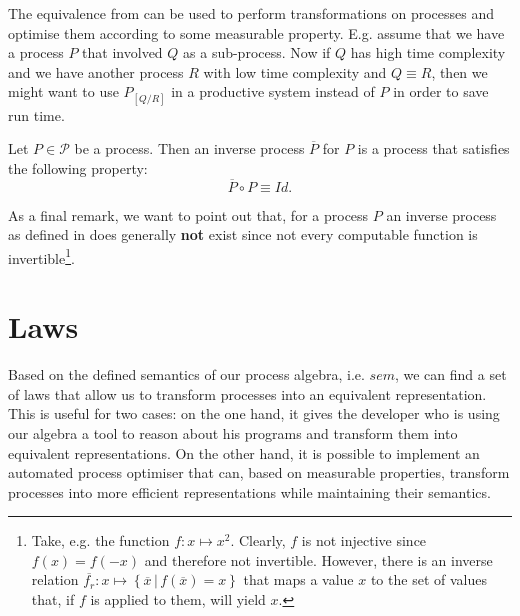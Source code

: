 The equivalence from  can be used to perform transformations on processes and optimise them according to some measurable property. E.g. assume that we have a process $P$ that involved $Q$ as a sub-process. Now if $Q$ has high time complexity and we have another process $R$ with low time complexity and $Q \equiv R$, then we might want to use $P_{\left[ Q / R \right]}$ in a productive system instead of $P$ in order to save run time.

\begin{definition}
\label{def:inverse_process}
Let $P \in \mathcal{P}$ be a process. Then an inverse process $\overline{P}$ for $P$ is a process that satisfies the following property:
  \begin{equation}
    \overline{P} \circ P \equiv Id.
  \end{equation}
  \hfill\qedsymbol
\end{definition}

As a final remark, we want to point out that, for a process $P$ an inverse process as defined in  does generally \textbf{not} exist since not every computable function is invertible\footnote{Take, e.g. the function $f \colon x \mapsto x^2$. Clearly, $f$ is not injective since $f \left( x \right) = f \left( -x \right)$ and therefore not invertible. However, there is an inverse relation $\overline{f_r} \colon x \mapsto \left\{ \overline{x} \,|\, f \left( \overline{x} \right) = x \right\}$ that maps a value $x$ to the set of values that, if $f$ is applied to them, will yield $x$.}.






\section{Laws}
\label{chp:laws}
Based on the defined semantics of our process algebra, i.e. $sem$, we can find a set of laws that allow us to transform processes into an equivalent representation. This is useful for two cases: on the one hand, it gives the developer who is using our algebra a tool to reason about his programs and transform them into equivalent representations. On the other hand, it is possible to implement an automated process optimiser that can, based on measurable properties, transform processes into more efficient representations while maintaining their semantics.

